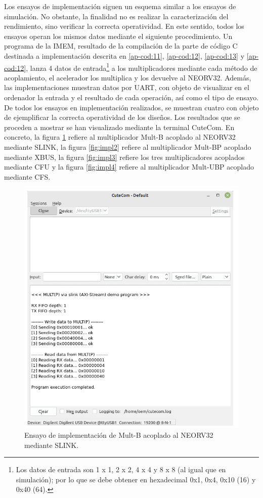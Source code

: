 Los ensayos de implementación siguen un esquema similar a los ensayos de simulación.
No obstante, la finalidad no es realizar la caracterización del rendimiento, sino verificar la correcta operatividad.
En este sentido, todos los ensayos operan los mismos datos mediante el siguiente procedimiento.
Un programa de la IMEM, resultado de la compilación de la parte de código C destinada a implementación descrita en \ref{ap-cod:11}, \ref{ap-cod:12}, \ref{ap-cod:13} y \ref{ap-cod:12}, lanza 4 datos de entrada\footnote{Los datos de entrada son 1 x 1, 2 x 2, 4 x 4 y 8 x 8 (al igual que en simulación); por lo que se debe obtener en hexadecimal 0x1, 0x4, 0x10 (16) y 0x40 (64).} a los multiplicadores mediante cada método de acoplamiento, el acelerador los multiplica y los devuelve al NEORV32.
Además, las implementaciones muestran datos por UART, con objeto de visualizar en el ordenador la entrada y el resultado de cada operación, así como el tipo de ensayo.
De todos los ensayos en implementación realizados, se muestran cuatro con objeto de ejemplificar la correcta operatividad de los diseños.
Los resultados que se proceden a mostrar se han visualizado mediante la terminal CuteCom.
En concreto, la figura \ref{fig:impl1} refiere al multiplicador Mult-B acoplado al NEORV32 mediante SLINK, la figura \ref{fig:impl2} refiere al multiplicador Mult-BP acoplado mediante XBUS, la figura \ref{fig:impl3} refiere los tres multiplicadores acoplados mediante CFU y la figura \ref{fig:impl4} refiere al multiplicador Mult-UBP acoplado mediante CFS.

\begin{figure}[H]
    \centering
    \includegraphics[width=14cm]{Figuras/impl1.png}
    \caption{Ensayo de implementación de Mult-B acoplado al NEORV32 mediante SLINK.}
    \label{fig:impl1}
\end{figure}

